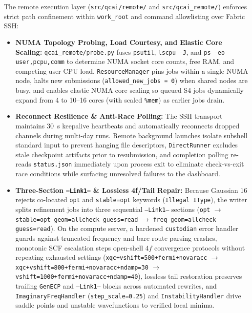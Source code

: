 \documentclass[journal=jcisd8,manuscript=article]{achemso}
\begin{document}
The remote execution layer (\texttt{src/qcai/remote/} and \texttt{src/qcai\_remote/}) enforces strict path confinement within \texttt{work\_root} and command allowlisting over Fabric SSH:
\begin{itemize}
  \item \textbf{NUMA Topology Probing, Load Courtesy, and Elastic Core Scaling:} \texttt{qcai\_remote/probe.py} fuses \texttt{psutil}, \texttt{lscpu -J}, and \texttt{ps -eo user,pcpu,comm} to determine NUMA socket core counts, free RAM, and competing user CPU load. \texttt{ResourceManager} pins jobs within a single NUMA node, halts new submissions (\texttt{allowed\_new\_jobs = 0}) when shared nodes are busy, and enables elastic NUMA core scaling so queued S4 jobs dynamically expand from 4 to 10--16 cores (with scaled \texttt{\%mem}) as earlier jobs drain.
  \item \textbf{Reconnect Resilience \& Anti-Race Polling:} The SSH transport maintains 30~s keepalive heartbeats and automatically reconnects dropped channels during multi-day runs. Remote background launches isolate subshell standard input to prevent hanging file descriptors, \texttt{DirectRunner} excludes stale checkpoint artifacts prior to resubmission, and completion polling re-reads \texttt{status.json} immediately upon process exit to eliminate check-vs-exit race conditions while surfacing unresolved failures to the dashboard.
  \item \textbf{Three-Section \texttt{--Link1--} \& Lossless 4f/Tail Repair:} Because Gaussian 16 rejects co-located \texttt{opt} and \texttt{stable=opt} keywords (\texttt{Illegal IType}), the writer splits refinement jobs into three sequential \texttt{--Link1--} sections (\texttt{opt} $\rightarrow$ \texttt{stable=opt geom=allcheck guess=read} $\rightarrow$ \texttt{freq geom=allcheck guess=read}). On the compute server, a hardened \texttt{custodian} error handler guards against truncated frequency and bare-route parsing crashes, monotonic SCF escalation steps open-shell $4f$ convergence protocols without repeating exhausted settings (\texttt{xqc+vshift=500+\allowbreak{}fermi+novaracc} $\rightarrow$ \texttt{xqc+vshift=800+\allowbreak{}fermi+novaracc+ndamp=30} $\rightarrow$ \texttt{vshift=1000+\allowbreak{}fermi+novaracc+ndamp=40}), lossless tail restoration preserves trailing \texttt{GenECP} and \texttt{--Link1--} blocks across automated rewrites, and \texttt{ImaginaryFreqHandler} (\texttt{step\_scale=0.25}) and \texttt{InstabilityHandler} drive saddle points and unstable wavefunctions to verified local minima.
\end{itemize}
\end{document}
